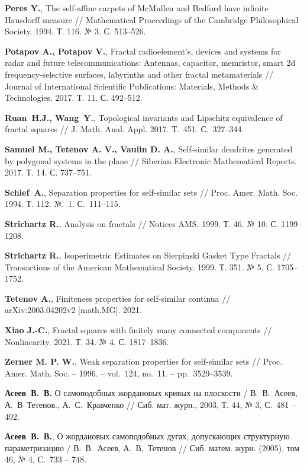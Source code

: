\begin{thebibliography}{99}
{\bf Peres Y.},
The self-affine carpets of McMullen and Bedford have infinite Hausdorff measure // 
Mathematical Proceedings of the Cambridge Philosophical Society. 1994. Т. 116. № 3. С. 513--526.

{\bf Potapov A., Potapov V.},
Fractal radioelement’s, devices and systems for radar and future telecommunications: Antennas, capacitor, memristor, smart 2d frequency-selective surfaces, labyrinths and other fractal metamaterials // Journal of International Scientific Publications: Materials, Methods & Technologies. 2017. Т. 11. С. 492--512.

{\bf Ruan~H.J., Wang~Y.},
Topological invariants and Lipschitz equivalence of fractal squares //
J. Math. Anal. Appl.  2017. Т.~451. С.~327--344.

{\bf Samuel M., Tetenov A. V., Vaulin D. A.},
Self-similar dendrites generated by polygonal systems in the plane //
Siberian Electronic Mathematical Reports. 2017. Т. 14. С. 737--751.

{\bf Schief~A.},  Separation properties for self-similar sets // 
Proc. Amer. Math. Soc. 1994. Т. 112. №.~1. С.~111--115.

{\bf Strichartz R.},
Analysis on fractals // 
Notices AMS. 1999. Т. 46. № 10. С. 1199--1208.

{\bf Strichartz R.},
Isoperimetric Estimates on Sierpinski Gasket Type Fractals // 
Transactions of the American Mathematical Society. 1999. Т. 351. № 5. С. 1705--1752.

{\bf Tetenov A.},
Finiteness properties for self-similar continua // 
arXiv:2003.04202v2 [math.MG]. 2021.

{\bf Xiao J.-C.},
Fractal squares with finitely many connected components // 
Nonlinearity. 2021. Т. 34. № 4. С. 1817--1836.

{\bf Zerner M. P. W.},
Weak separation properties for self-similar sets // 
Proc. Amer. Math. Soc.  -- 1996. -- vol.~124, no.~11. -- pp.~3529--3539.

{\bf Асеев~В.~В.} 
О самоподобных жордановых кривых на плоскости / 
В.~В.~Асеев, А.~В~Тетенов., А.~С.~Кравченко //
Сиб. мат. журн., 2003, Т. 44, № 3, С.~481 -- 492.

{\bf Асеев~В.~В.},
О жордановых самоподобных дугах, допускающих структурную параметризацию /
В.~В.~Асеев, А.~В.~Тетенов //
Сиб. матем. журн. (2005), том 46, № 4, С.~733 -- 748.


\end{thebibliography}
